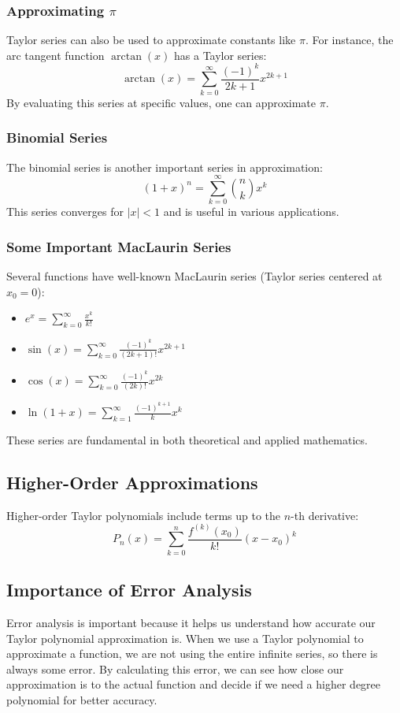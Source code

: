 \documentclass{article}
\begin{document}
\subsubsection*{Approximating \( \pi \)}
Taylor series can also be used to approximate constants like \( \pi \). For instance, the arc tangent function \( \arctan(x) \) has a Taylor series:
\[ \arctan(x) = \sum_{k=0}^{\infty} \frac{(-1)^k}{2k+1} x^{2k+1} \]
By evaluating this series at specific values, one can approximate \( \pi \).

\subsubsection*{Binomial Series}
The binomial series is another important series in approximation:
\[ (1 + x)^n = \sum_{k=0}^{\infty} \binom{n}{k} x^k \]
This series converges for \( |x| < 1 \) and is useful in various applications.

\subsubsection*{Some Important MacLaurin Series}
Several functions have well-known MacLaurin series (Taylor series centered at \( x_0 = 0 \)):
\begin{itemize}
    \item \( e^x = \sum_{k=0}^{\infty} \frac{x^k}{k!} \)
    \item \( \sin(x) = \sum_{k=0}^{\infty} \frac{(-1)^k}{(2k+1)!} x^{2k+1} \)
    \item \( \cos(x) = \sum_{k=0}^{\infty} \frac{(-1)^k}{(2k)!} x^{2k} \)
    \item \( \ln(1+x) = \sum_{k=1}^{\infty} \frac{(-1)^{k+1}}{k} x^k \)
\end{itemize}
These series are fundamental in both theoretical and applied mathematics.
\subsection*{Higher-Order Approximations}
Higher-order Taylor polynomials include terms up to the \( n \)-th derivative:
\[ P_n(x) = \sum_{k=0}^{n} \frac{f^{(k)}(x_0)}{k!} (x - x_0)^k \]
\subsection*{Importance of Error Analysis}
Error analysis is important because it helps us understand how accurate our Taylor polynomial approximation is. When we use a Taylor polynomial to approximate a function, we are not using the entire infinite series, so there is always some error. By calculating this error, we can see how close our approximation is to the actual function and decide if we need a higher degree polynomial for better accuracy.
\end{document}
